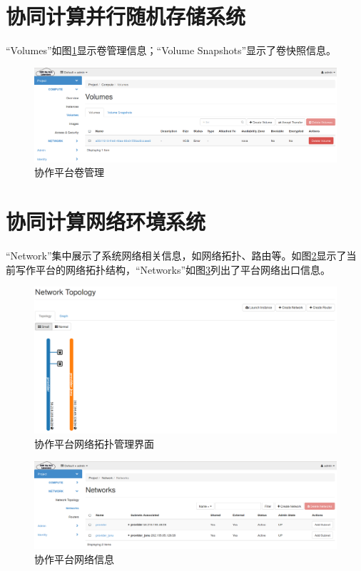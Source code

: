 \documentclass[12pt]{ctexart}%
\begin{document}
\section{协同计算并行随机存储系统}
``Volumes''如图\ref{fig:projectcomputevolumes}显示卷管理信息；``Volume Snapshots''显示了卷快照信息。
\begin{figure}[!htb]
\centering
\includegraphics[width=6in]{./figures/Project_Compute_Volumes}
\caption{协作平台卷管理}
\label{fig:projectcomputevolumes}
\end{figure}
\section{协同计算网络环境系统}
``Network''集中展示了系统网络相关信息，如网络拓扑、路由等。如图\ref{fig:projectnetworktopology}显示了当前写作平台的网络拓扑结构，``Networks''如图\ref{fig:projectnetworknetworks}列出了平台网络出口信息。
\begin{figure}[!htb]
\centering
\includegraphics[width=6in]{./figures/Project_Network_Topology}
\caption{协作平台网络拓扑管理界面}
\label{fig:projectnetworktopology}
\end{figure}

\begin{figure}[!htb]
\centering
\includegraphics[width=6in]{./figures/Project_Network_Networks}
\caption{协作平台网络信息}
\label{fig:projectnetworknetworks}
\end{figure}
\end{document}
